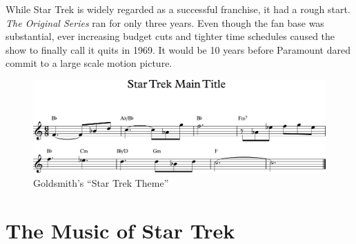 While Star Trek is widely regarded as a successful franchise, it had a rough start. \textit{The Original Series} ran for only three years. Even though the fan base was substantial, ever increasing budget cuts and tighter time schedules caused the show to finally call it quits in 1969. It would be 10 years before Paramount dared commit to a large scale motion picture. \parencite[87]{bond_music_1998}



\begin{figure}
\includegraphics[width=\linewidth]{gfx/snippet_main_theme}
\caption{Goldsmith's ``Star Trek Theme''}
\end{figure}

\section{The Music of Star Trek} 

